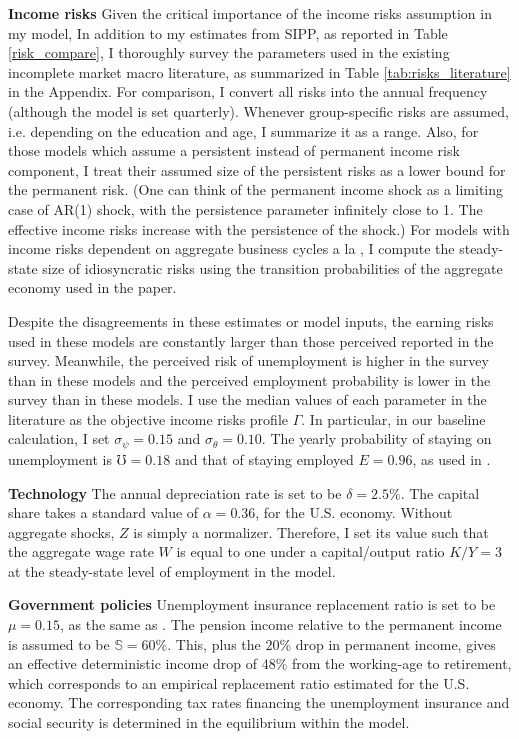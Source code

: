 \textbf{Income risks} Given the critical importance of the income risks assumption in my model, In addition to my estimates from SIPP, as reported in Table \ref{risk_compare}, I thoroughly survey the parameters used in the existing incomplete market macro literature, as summarized in Table \ref{tab:risks_literature} in the Appendix. For comparison, I convert all risks into the annual frequency (although the model is set quarterly). Whenever group-specific risks are assumed, i.e. depending on the education and age, I summarize it as a range. Also, for those models which assume a persistent instead of permanent income risk component, I treat their assumed size of the persistent risks as a lower bound for the permanent risk. (One can think of the permanent income shock as a limiting case of AR(1) shock, with the persistence parameter infinitely close to 1. The effective income risks increase with the persistence of the shock.)  For models with income risks dependent on aggregate business cycles a la \cite{krusell1998income}, I compute the steady-state size of idiosyncratic risks using the transition probabilities of the aggregate economy used in the paper.  

Despite the disagreements in these estimates or model inputs, the earning risks used in these models are constantly larger than those perceived reported in the survey. Meanwhile, the perceived risk of unemployment is higher in the survey than in these models and the perceived employment probability is lower in the survey than in these models. I use the median values of each parameter in the literature as the objective income risks profile $\Gamma$. In particular, in our baseline calculation, I set $\sigma_\psi = 0.15$ and $\sigma_\theta = 0.10$. The yearly probability of staying on unemployment is $\mho = 0.18$ and that of staying employed $E = 0.96$, as used in \cite{krueger2016macroeconomics}. 

\textbf{Technology} %
The annual depreciation rate is set to be $\delta =2.5\%$. The capital share takes a standard value of $\alpha = 0.36$, for the U.S. economy. Without aggregate shocks, $Z$ is simply a normalizer. Therefore, I set its value such that the aggregate wage rate $W$ is equal to one under a capital/output ratio $K/Y= 3$ at the steady-state level of employment in the model. 

\textbf{Government policies} Unemployment insurance replacement ratio is set to be $\mu=0.15$, as the same as \cite{krueger2016macroeconomics}.  
The pension income relative to the permanent income is assumed to be $\mathbb{S}=60\%$. This, plus the $ 20\%$ drop in permanent income, gives an effective deterministic income drop of $48\%$ from the working-age to retirement, which corresponds to an empirical replacement ratio estimated for the U.S. economy. The corresponding tax rates financing the unemployment insurance and social security is determined in the equilibrium within the model. 

